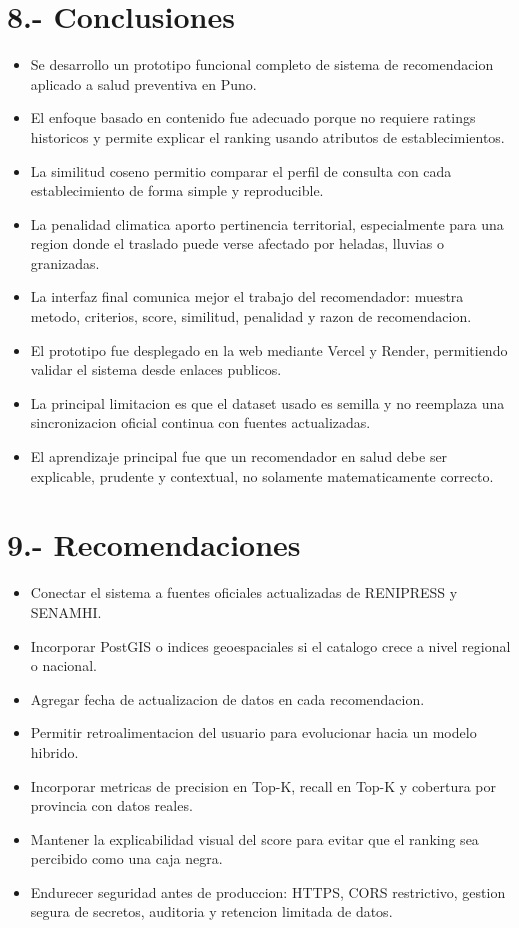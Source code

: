 \documentclass[12pt,a4paper]{article}
\begin{document}
\section{8.- Conclusiones}
\begin{itemize}[leftmargin=*]
  \item Se desarrollo un prototipo funcional completo de sistema de recomendacion aplicado a salud preventiva en Puno.
  \item El enfoque basado en contenido fue adecuado porque no requiere ratings historicos y permite explicar el ranking usando atributos de establecimientos.
  \item La similitud coseno permitio comparar el perfil de consulta con cada establecimiento de forma simple y reproducible.
  \item La penalidad climatica aporto pertinencia territorial, especialmente para una region donde el traslado puede verse afectado por heladas, lluvias o granizadas.
  \item La interfaz final comunica mejor el trabajo del recomendador: muestra metodo, criterios, score, similitud, penalidad y razon de recomendacion.
  \item El prototipo fue desplegado en la web mediante Vercel y Render, permitiendo validar el sistema desde enlaces publicos.
  \item La principal limitacion es que el dataset usado es semilla y no reemplaza una sincronizacion oficial continua con fuentes actualizadas.
  \item El aprendizaje principal fue que un recomendador en salud debe ser explicable, prudente y contextual, no solamente matematicamente correcto.
\end{itemize}

\section{9.- Recomendaciones}
\begin{itemize}[leftmargin=*]
  \item Conectar el sistema a fuentes oficiales actualizadas de RENIPRESS y SENAMHI.
  \item Incorporar PostGIS o indices geoespaciales si el catalogo crece a nivel regional o nacional.
  \item Agregar fecha de actualizacion de datos en cada recomendacion.
  \item Permitir retroalimentacion del usuario para evolucionar hacia un modelo hibrido.
  \item Incorporar metricas de precision en Top-K, recall en Top-K y cobertura por provincia con datos reales.
  \item Mantener la explicabilidad visual del score para evitar que el ranking sea percibido como una caja negra.
  \item Endurecer seguridad antes de produccion: HTTPS, CORS restrictivo, gestion segura de secretos, auditoria y retencion limitada de datos.
\end{itemize}
\end{document}

